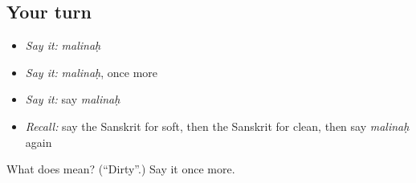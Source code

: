 \subsection*{Your turn}
\begin{itemize}
\raggedright
  \item \emph{Say it:} \emph{malinaḥ}
  \item \emph{Say it:} \emph{malinaḥ}, once more
  \item \emph{Say it:} say \emph{malinaḥ}
  \item \emph{Recall:} say the Sanskrit for soft, then the Sanskrit for clean, then say \emph{malinaḥ} again
\end{itemize}

\begin{tcolorbox}[breakable,colback=teal!4,colframe=teal!35!black,title={Before you move on}]
What does  mean? (\textquotedblleft{}Dirty\textquotedblright{}.) Say it once more.
\end{tcolorbox}
